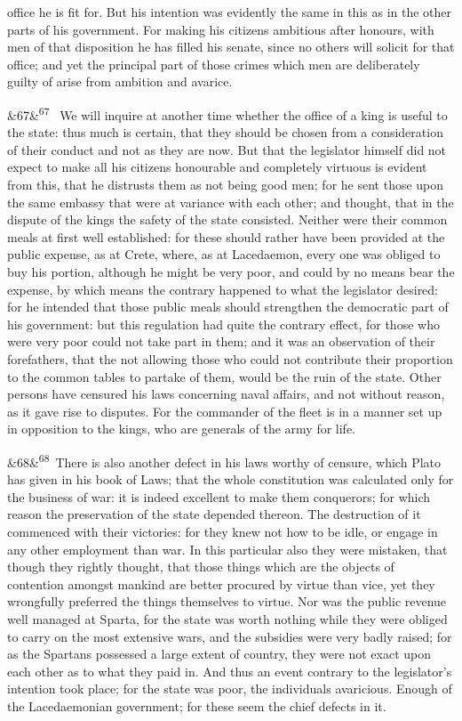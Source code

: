 \documentclass[12pt]{article}
\newcommand{\para}[1][]{\par\noindent\ifx&#1&\else\textsuperscript{\footnotesize #1}~\fi}
\begin{document}
office he is fit for. But his intention was evidently the same in this as in the other parts of his government. For making his citizens ambitious after honours, with men of that disposition he has filled his senate, since no others will solicit for that office; and yet the principal part of those crimes which men are deliberately guilty of arise from ambition and avarice.

\para[67] We will inquire at another time whether the office of a king is useful to the state: thus much is certain, that they should be chosen from a consideration of their conduct and not as they are now. But that the legislator himself did not expect to make all his citizens honourable and completely virtuous is evident from this, that he distrusts them as not being good men; for he sent those upon the same embassy that were at variance with each other; and thought, that in the dispute of the kings the safety of the state consisted. Neither were their common meals at first well established: for these should rather have been provided at the public expense, as at Crete, where, as at Lacedaemon, every one was obliged to buy his portion, although he might be very poor, and could by no means bear the expense, by which means the contrary happened to what the legislator desired: for he intended that those public meals should strengthen the democratic part of his government: but this regulation had quite the contrary effect, for those who were very poor could not take part in them; and it was an observation of their forefathers, that the not allowing those who could not contribute their proportion to the common tables to partake of them, would be the ruin of the state. Other persons have censured his laws concerning naval affairs, and not without reason, as it gave rise to disputes. For the commander of the fleet is in a manner set up in opposition to the kings, who are generals of the army for life.

\para[68] [1271b] There is also another defect in his laws worthy of censure, which Plato has given in his book of Laws; that the whole constitution was calculated only for the business of war: it is indeed excellent to make them conquerors; for which reason the preservation of the state depended thereon. The destruction of it commenced with their victories: for they knew not how to be idle, or engage in any other employment than war. In this particular also they were mistaken, that though they rightly thought, that those things which are the objects of contention amongst mankind are better procured by virtue than vice, yet they wrongfully preferred the things themselves to virtue. Nor was the public revenue well managed at Sparta, for the state was worth nothing while they were obliged to carry on the most extensive wars, and the subsidies were very badly raised; for as the Spartans possessed a large extent of country, they were not exact upon each other as to what they paid in. And thus an event contrary to the legislator's intention took place; for the state was poor, the individuals avaricious. Enough of the Lacedaemonian government; for these seem the chief defects in it.
\end{document}
